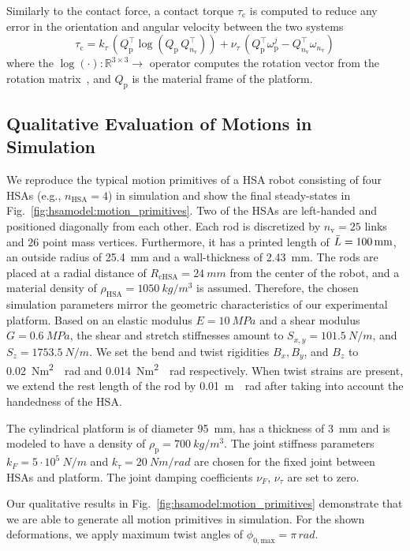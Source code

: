 Similarly to the contact force, a contact torque $\tau_\mathrm{c}$ is computed to reduce any error in the orientation and angular velocity between the two systems
\begin{equation}
    \tau_\mathrm{c} = k_\tau \, (Q_\mathrm{p}^\top \log(Q_\mathrm{p} \, Q_{n_\mathrm{v}}^\top)) + \nu_\tau \, (Q_\mathrm{p}^\top \omega_\mathrm{p}^j - Q_{n_\mathrm{v}}^\top \omega_{n_\mathrm{v}})
\end{equation}
where the $\log(\cdot): \mathbb{R}^{3 \times 3} \rightarrow $ operator computes the rotation vector from the rotation matrix~\citep{gazzola2018forward}, and $Q_\mathrm{p}$ is the material frame of the platform.

\subsection{Qualitative Evaluation of Motions in Simulation}\label{sub:hsamodel:hsa_robot_simulation:motion_primitives}
We reproduce the typical motion primitives of a \gls{HSA} robot consisting of four \glspl{HSA} (e.g., $n_\mathrm{HSA} = 4$) in simulation and show the final steady-states in Fig.~\ref{fig:hsamodel:motion_primitives}. Two of the \glspl{HSA} are left-handed and positioned diagonally from each other. 
Each rod is discretized by $n_\mathrm{v} = 25$ links and $26$ point mass vertices. Furthermore, it has a printed length of $\Bar{L} = \SI{100}{mm}$, an outside radius of \SI{25.4}{mm} and a wall-thickness of \SI{2.43}{mm}. The rods are placed at a radial distance of $R_\mathrm{cHSA} = \SI{24}{mm}$ from the center of the robot, and a material density of $\rho_\mathrm{HSA} = \SI{1050}{kg \per m^3}$ is assumed. Therefore, the chosen simulation parameters mirror the geometric characteristics of our experimental platform.
Based on an elastic modulus $E=\SI{10}{MPa}$ and a shear modulus $G=\SI{0.6}{MPa}$, the shear and stretch stiffnesses amount to $S_{x,y} = \SI{101.5}{N \per m}$, and $S_z = \SI{1753.5}{N \per m}$.
We set the bend and twist rigidities $B_{x}, B_y$, and $B_z$ to \SI{0.02}{Nm^2 \per rad} and \SI{0.014}{Nm^2 \per rad} respectively. When twist strains are present, we extend the rest length of the rod by \SI{0.01}{m \per rad} after taking into account the handedness of the \gls{HSA}.

The cylindrical platform is of diameter \SI{95}{mm}, has a thickness of \SI{3}{mm} and is modeled to have a density of $\rho_\mathrm{p} = \SI{700}{kg / m^3}$.
The joint stiffness parameters $k_F = 5\cdot 10^5 \: \si{N \per m}$ and $k_\tau = 20 \: \si{Nm \per rad}$ are chosen for the fixed joint between \glspl{HSA} and platform. The joint damping coefficients $\nu_F$, $\nu_\tau$ are set to zero.

Our qualitative results in Fig.~\ref{fig:hsamodel:motion_primitives} demonstrate that we are able to generate all motion primitives in simulation. For the shown deformations, we apply maximum twist angles of $\phi_{0,\mathrm{max}} = \pi \, \si{rad}$. %